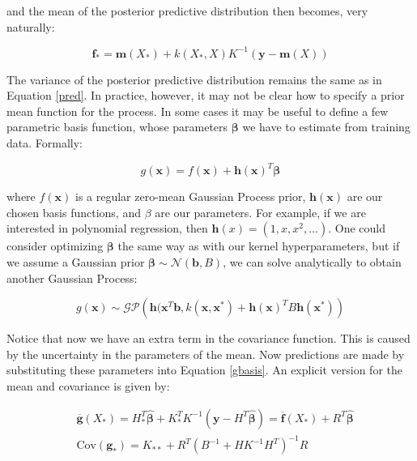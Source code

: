 \documentclass[10pt,a4paper,twoside]{book}
\begin{document}
and the mean of the posterior predictive distribution then becomes, very naturally:

\begin{equation}
\boldsymbol{f}_* = \boldsymbol{m}(X_*) + k(X_*, X)K^{-1}\left(\boldsymbol{y} - \boldsymbol{m}(X)\right) 
\end{equation}

The variance of the posterior predictive distribution remains the same as in Equation \ref{pred}. In practice, however, it may not be clear how to specify a prior mean function for the process. In some cases it may be useful to define a few parametric basis function, whose parameters $\boldsymbol{\beta}$ we have to estimate from training data. Formally:

\begin{equation}
\label{gbasis}
g(\boldsymbol{x}) = f(\boldsymbol{x}) + \boldsymbol{h}(\boldsymbol{x})^T\boldsymbol{\beta}
\end{equation}

where $f(\boldsymbol{x})$ is a regular zero-mean Gaussian Process prior, $\boldsymbol{h}(\boldsymbol{x})$ are our chosen basis functions, and $\beta$ are our parameters. For example, if we are interested in polynomial regression, then $\boldsymbol{h}(x) = (1, x, x^2, \dots)$. One could consider optimizing $\boldsymbol{\beta}$ the same way as with our kernel hyperparameters, but if we assume a Gaussian prior $\boldsymbol{\beta} \sim \mathcal{N}(\boldsymbol{b}, B)$, we can solve analytically to obtain another Gaussian Process:

\begin{equation}
g(\boldsymbol{x}) \sim \mathcal{G}\mathcal{P}\left(\boldsymbol{h}(\boldsymbol{x}^T\boldsymbol{b}, k(\boldsymbol{x}, \boldsymbol{x}^*) + \boldsymbol{h}(\boldsymbol{x})^T B \boldsymbol{h}(\boldsymbol{x}^*)\right)
\end{equation} 

Notice that now we have an extra term in the covariance function. This is caused by the uncertainty in the parameters of the mean. Now predictions are made by substituting these parameters into Equation \ref{gbasis}. An explicit version for the mean and covariance is given by:

\begin{align}
&\overline{\boldsymbol{g}}(X_*) = H^T_* \hat{\boldsymbol{\beta}} + K_*^T K^{-1}(\boldsymbol{y} - H^T\hat{\boldsymbol{\beta}}) = \overline{\boldsymbol{f}}(X_*) + R^T\hat{\boldsymbol{\beta}}\\
&\mathrm{Cov}(\boldsymbol{g_*}) = K_{**} + R^T(B^{-1} + HK^{-1}H^T)^{-1}R
\end{align}
\end{document}
